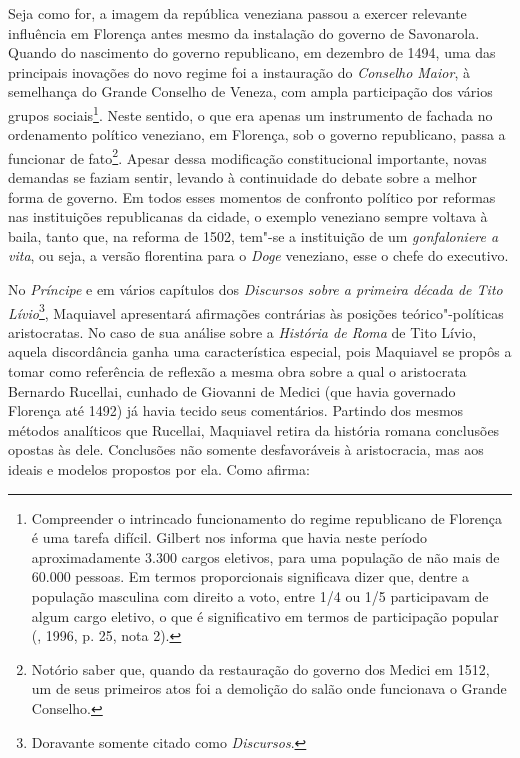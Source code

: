 Seja como for, a imagem da república veneziana passou a exercer
relevante influência em Florença antes mesmo da instalação do governo de
Savonarola. Quando do nascimento do governo republicano, em dezembro de
1494, uma das principais inovações do novo regime foi a instauração do
\emph{Conselho Maior}, à semelhança do Grande Conselho de Veneza, com
ampla participação dos vários grupos sociais\footnote{Compreender o
  intrincado funcionamento do regime republicano de Florença é uma
  tarefa difícil. Gilbert nos informa que havia neste período
  aproximadamente 3.300 cargos eletivos, para uma população de não mais
  de 60.000 pessoas. Em termos proporcionais significava dizer que,
  dentre a população masculina com direito a voto, entre 1/4 ou 1/5
  participavam de algum cargo eletivo, o que é significativo em termos
  de participação popular (, 1996, p. 25, nota 2).}. Neste
sentido, o que era apenas um instrumento de fachada no ordenamento
político veneziano, em Florença, sob o governo republicano, passa a
funcionar de fato\footnote{Notório saber que, quando da restauração do
  governo dos Medici em 1512, um de seus primeiros atos foi a demolição
  do salão onde funcionava o Grande Conselho.}. Apesar dessa modificação
constitucional importante, novas demandas se faziam sentir, levando à
continuidade do debate sobre a melhor forma de governo. Em todos esses
momentos de confronto político por reformas nas instituições
republicanas da cidade, o exemplo veneziano sempre voltava à baila,
tanto que, na reforma de 1502, tem"-se a instituição de um
\emph{gonfaloniere a vita}, ou seja, a versão florentina para o
\emph{Doge} veneziano, esse o chefe do executivo.

No \emph{Príncipe} e em vários capítulos dos \emph{Discursos sobre a
primeira década de Tito Lívio}\footnote{Doravante somente citado como
  \emph{Discursos}.}, Maquiavel apresentará afirmações contrárias às
posições teórico"-políticas aristocratas. No caso de sua análise sobre a
\emph{História de Roma} de Tito Lívio, aquela discordância ganha uma
característica especial, pois Maquiavel se propôs a tomar como
referência de reflexão a mesma obra sobre a qual o aristocrata Bernardo
Rucellai, cunhado de Giovanni de Medici (que havia governado Florença
até 1492) já havia tecido seus comentários. Partindo dos mesmos métodos
analíticos que Rucellai, Maquiavel retira da história romana conclusões
opostas às dele. Conclusões não somente desfavoráveis à aristocracia,
mas aos ideais e modelos propostos por ela. Como afirma:

